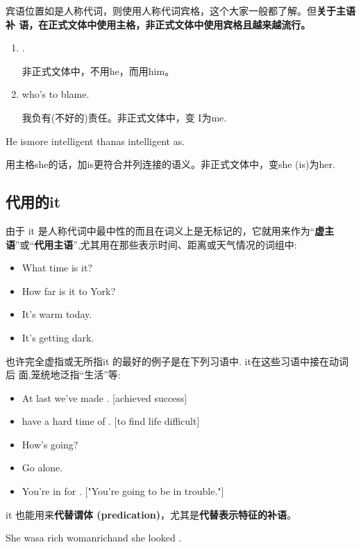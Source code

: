宾语位置如是人称代词，则使用人称代词宾格，这个大家一般都了解。但\textbf{关于主语补
  语，在正式文体中使用主格，非正式文体中使用宾格且越来越流行。}

\begin{enumerate}
\item {}  .

  非正式文体中，不用he，而用him。

\item  {}  who's to blame.

  我负有(不好的)责任。非正式文体中，变 I为me.
\end{enumerate}

\begin{sdbig4}{He is}{more intelligent than}{as intelligent as}{.}
\end{sdbig4}
用主格she的话，加is更符合并列连接的语义。非正式文体中，变she (is)为her.

\subsection{代用的it}

由于 it 是人称代词中最中性的而且在词义上是无标记的，它就用来作为“\textbf{虚主
  语}”或“\textbf{代用主语}”,尤其用在那些表示时间、距离或天气情况的词组中:
\begin{itemize}
\item What time is it?
\item How far is it to York?
\item It's warm today.
\item It's getting dark.
\end{itemize}

也许完全虚指或无所指it 的最好的例子是在下列习语中. it在这些习语中接在动词后
面,笼统地泛指“生活”等:
\begin{itemize}
\item At last we've made . [achieved success]
\item have a hard time of . [to find life difficult]
\item How's  going?
\item Go  alone.
\item You're in for . ["You're going to be in trouble."]
\end{itemize}

it 也能用来\textbf{代替谓体 (predication)}，尤其是\textbf{代替表示特征的补语}。
\begin{sdbig4}{She was}{a rich woman}{rich}{and she looked .}
\end{sdbig4}

